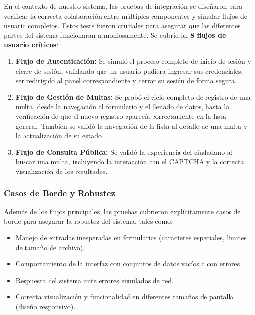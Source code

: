 En el contexto de nuestro sistema, las pruebas de integración se diseñaron para verificar la correcta colaboración entre múltiples componentes y simular flujos de usuario completos. Estos tests fueron cruciales para asegurar que las diferentes partes del sistema funcionaran armoniosamente. Se cubrieron \textbf{8 flujos de usuario críticos}:

\begin{enumerate}
    \item \textbf{Flujo de Autenticación:} Se simuló el proceso completo de inicio de sesión y cierre de sesión, validando que un usuario pudiera ingresar sus credenciales, ser redirigido al panel correspondiente y cerrar su sesión de forma segura.
    
    \item \textbf{Flujo de Gestión de Multas:} Se probó el ciclo completo de registro de una multa, desde la navegación al formulario y el llenado de datos, hasta la verificación de que el nuevo registro aparecía correctamente en la lista general. También se validó la navegación de la lista al detalle de una multa y la actualización de su estado.
    
    \item \textbf{Flujo de Consulta Pública:} Se validó la experiencia del ciudadano al buscar una multa, incluyendo la interacción con el CAPTCHA y la correcta visualización de los resultados.
\end{enumerate}

\subsubsection{Casos de Borde y Robustez}

Además de los flujos principales, las pruebas cubrieron explícitamente casos de borde para asegurar la robustez del sistema, tales como:

\begin{itemize}
    \item Manejo de entradas inesperadas en formularios (caracteres especiales, límites de tamaño de archivo).
    \item Comportamiento de la interfaz con conjuntos de datos vacíos o con errores.
    \item Respuesta del sistema ante errores simulados de red.
    \item Correcta visualización y funcionalidad en diferentes tamaños de pantalla (diseño responsivo).
\end{itemize}

